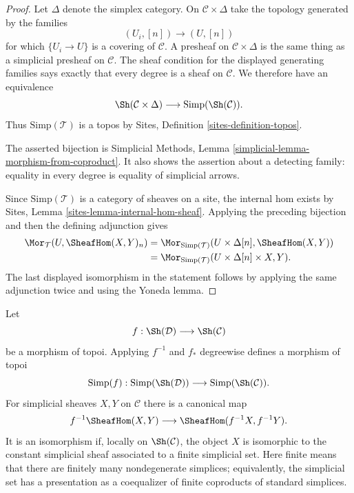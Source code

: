 \begin{proof}
Let $\Delta$ denote the simplex category.  On
$\mathcal{C} \times \Delta$ take the topology generated by the families
$$
(U_i,[n]) \longrightarrow (U,[n])
$$
for which $\{U_i \to U\}$ is a covering of $\mathcal{C}$.  A presheaf on
$\mathcal{C} \times \Delta$ is the same thing as a simplicial presheaf on
$\mathcal{C}$.  The sheaf condition for the displayed generating families
says exactly that every degree is a sheaf on $\mathcal{C}$.  We therefore
have an equivalence
$$
\Sh(\mathcal{C} \times \Delta)
\longrightarrow
\text{Simp}(\Sh(\mathcal{C})).
$$
Thus $\text{Simp}(\mathcal{T})$ is a topos by Sites, Definition
\ref{sites-definition-topos}.

The asserted bijection is Simplicial Methods, Lemma
\ref{simplicial-lemma-morphism-from-coproduct}.  It also shows the assertion
about a detecting family: equality in every degree is equality of simplicial
arrows.

Since $\text{Simp}(\mathcal{T})$ is a category of sheaves on a site, the
internal hom exists by Sites, Lemma
\ref{sites-lemma-internal-hom-sheaf}.  Applying the preceding bijection and
then the defining adjunction gives
\begin{align*}
\Mor_{\mathcal{T}}(U,\SheafHom(X,Y)_n)
&=
\Mor_{\text{Simp}(\mathcal{T})}
(U \times \Delta[n],\SheafHom(X,Y)) \\
&=
\Mor_{\text{Simp}(\mathcal{T})}
(U \times \Delta[n] \times X,Y).
\end{align*}
The last displayed isomorphism in the statement follows by applying the
same adjunction twice and using the Yoneda lemma.
\end{proof}

\begin{lemma}
\label{lemma-illusie-I-simplicial-topos-morphism}
Let
$$
f : \Sh(\mathcal{D}) \longrightarrow \Sh(\mathcal{C})
$$
be a morphism of topoi.  Applying $f^{-1}$ and $f_*$ degreewise defines a
morphism of topoi
$$
\text{Simp}(f) :
\text{Simp}(\Sh(\mathcal{D}))
\longrightarrow
\text{Simp}(\Sh(\mathcal{C})).
$$
For simplicial sheaves $X,Y$ on $\mathcal{C}$ there is a canonical map
$$
f^{-1}\SheafHom(X,Y)
\longrightarrow
\SheafHom(f^{-1}X,f^{-1}Y).
$$
It is an isomorphism if, locally on $\Sh(\mathcal{C})$, the object $X$ is
isomorphic to the constant simplicial sheaf associated to a finite
simplicial set.  Here finite means that there are finitely many
nondegenerate simplices; equivalently, the simplicial set has a presentation
as a coequalizer of finite coproducts of standard simplices.
\end{lemma}


